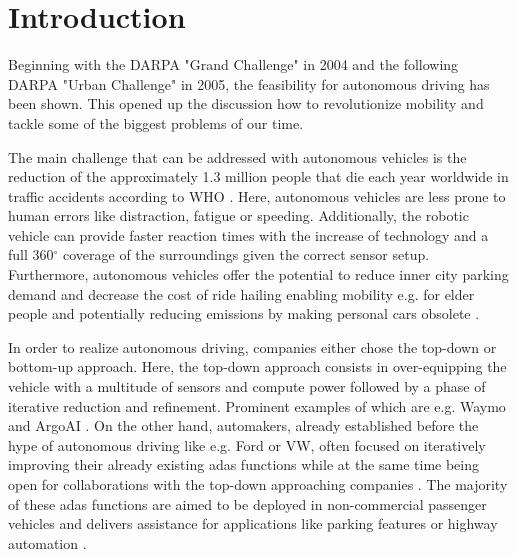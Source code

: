 \chapter{Introduction}
\label{ch:introduction}
Beginning with the DARPA "Grand Challenge" \cite{thrun2006stanley} in 2004 and the following DARPA "Urban Challenge" \cite{Urmson-2007-9708} in 2005, the feasibility for autonomous driving has been shown. This opened up the discussion how to revolutionize mobility and tackle some of the biggest problems of our time. 

The main challenge that can be addressed with autonomous vehicles is the reduction of the approximately 1.3 million people that die each year worldwide in traffic accidents according to WHO \cite{world2018global}. Here, autonomous vehicles are less prone to human errors like distraction, fatigue or speeding. Additionally, the robotic vehicle can provide faster reaction times with the increase of technology and a full 360$^{\circ}$ coverage of the surroundings given the correct sensor setup. Furthermore, autonomous vehicles offer the potential to reduce inner city parking demand \cite{zhang2020impacts} and decrease the cost of ride hailing enabling mobility e.g. for elder people and potentially reducing emissions by making personal cars obsolete \cite{severino2021autonomous}.  

In order to realize autonomous driving, companies either chose the top-down or bottom-up approach. Here, the top-down approach consists in over-equipping the vehicle with a multitude of sensors and compute power followed by a phase of iterative reduction and refinement. Prominent examples of which are e.g. Waymo \cite{sun2020scalability} and ArgoAI \cite{chang2019argoverse}. On the other hand, automakers, already established before the hype of autonomous driving like e.g. Ford or VW, often focused on iteratively improving their already existing \gls{adas} functions while at the same time being open for collaborations with the top-down approaching companies \cite{fordargovw2020}. The majority of these \gls{adas} functions are aimed to be deployed in non-commercial passenger vehicles and delivers assistance for applications like parking features \cite{fordvaletparking2021} or highway automation \cite{fordlanekeeping2021}.

